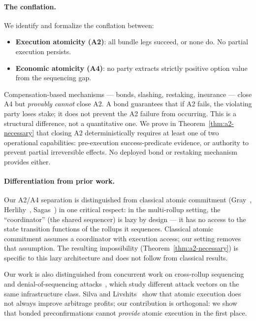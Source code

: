 \paragraph{The conflation.}
We identify and formalize the conflation between:
\begin{itemize}
  \item \textbf{Execution atomicity (A2)}: all bundle legs succeed, or
    none do. No partial execution persists.
  \item \textbf{Economic atomicity (A4)}: no party extracts strictly
    positive option value from the sequencing gap.
\end{itemize}
Compensation-based mechanisms --- bonds, slashing, restaking, insurance ---
close A4 but \emph{provably cannot} close A2. A bond guarantees that if
A2 fails, the violating party loses stake; it does not prevent the A2
failure from occurring. This is a structural difference, not a quantitative
one. We prove in Theorem~\ref{thm:a2-necessary} that closing A2
deterministically requires at least one of two operational capabilities:
pre-execution success-predicate evidence, or authority to prevent partial
irreversible effects. No deployed bond or restaking mechanism provides
either.

\paragraph{Differentiation from prior work.}
Our A2/A4 separation is distinguished from classical atomic commitment
(Gray~\cite{gray1978notes}, Herlihy~\cite{herlihy1991wait},
Sagas~\cite{garcia-molina1987sagas}) in one critical respect: in the
multi-rollup setting, the ``coordinator'' (the shared sequencer) is lazy
by design --- it has no access to the state transition functions of the
rollups it sequences. Classical atomic commitment assumes a coordinator
with execution access; our setting removes that assumption. The resulting
impossibility (Theorem~\ref{thm:a2-necessary}) is specific to this lazy
architecture and does not follow from classical results.

Our work is also distinguished from concurrent work on cross-rollup
sequencing~\cite{arxiv2410.11552} and denial-of-sequencing
attacks~\cite{ccs2025dos}, which study different attack
vectors on the same infrastructure class.
Silva and Livshits~\cite{arxiv2410.11552} show that atomic execution does not
always improve arbitrage profits; our contribution is orthogonal: we show
that bonded preconfirmations cannot \emph{provide} atomic execution in the
first place.

